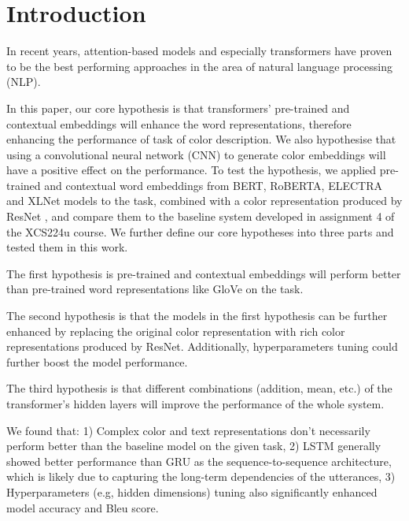 \section{Introduction}

In recent years, attention-based models and especially transformers have proven to be the best performing approaches in the area of natural language processing (NLP).

\par
In this paper, our core hypothesis is that transformers’ pre-trained and contextual embeddings will enhance the word representations, therefore enhancing the performance of task of color description. We also hypothesise that using a convolutional neural network (CNN) to generate color embeddings will have a positive effect on the performance.  To test the hypothesis,  we applied pre-trained and contextual word embeddings from BERT, RoBERTA, ELECTRA and XLNet models to the task, combined with a color representation produced by ResNet , and compare them to the baseline system developed in assignment 4 of the XCS224u course. We further define our core hypotheses into three parts and tested them in this work.

\par
The first hypothesis is pre-trained and contextual embeddings will perform better than pre-trained word representations like GloVe on the task.

\par
The second hypothesis is that the models in the first hypothesis can be further enhanced by replacing the original color representation with rich color representations produced by ResNet. Additionally, hyperparameters tuning could further  boost the model performance.

\par
The third hypothesis is that different combinations (addition, mean, etc.) of the transformer’s hidden layers will improve the performance of the whole system.

\par
We found that: 1) Complex color and text representations don’t necessarily perform better than the baseline model on the given task, 2) LSTM generally showed better performance than GRU as the sequence-to-sequence architecture, which is likely due to capturing the long-term dependencies of the utterances, 3) Hyperparameters (e.g, hidden dimensions) tuning also significantly enhanced model accuracy and Bleu score.

